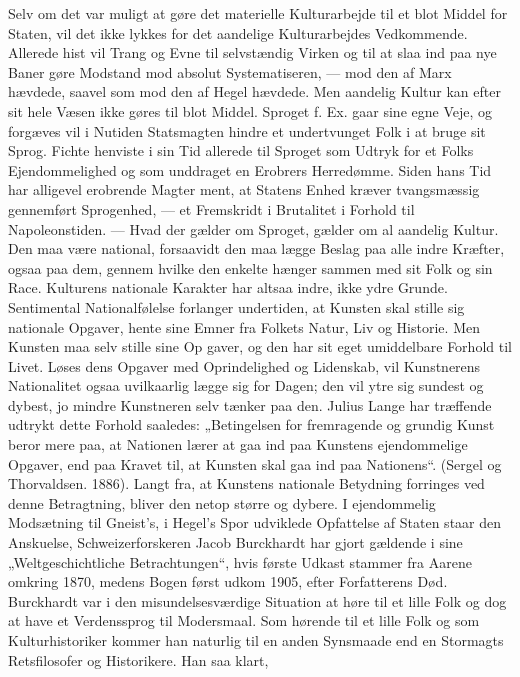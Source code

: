 \documentclass[12pt,a4paper,openany]{book}
\newcommand{\opage}[1]{\marginnote{\footnotesize\textit{[#1]}}}
\begin{document}
Selv om det var muligt at gøre det materielle Kulturarbejde til et
blot Middel for Staten, vil det ikke lykkes for det aandelige Kulturarbejdes
Vedkommende. Allerede hist vil Trang og Evne til selvstændig
Virken og til at slaa ind paa nye Baner gøre Modstand mod
absolut Systematiseren, --- mod den af Marx hævdede, saavel som
mod den af Hegel hævdede. Men aandelig Kultur kan efter sit hele
Væsen ikke gøres til blot Middel. Sproget f. Ex. gaar sine egne Veje,
og forgæves vil i Nutiden Statsmagten hindre et undertvunget Folk i
at bruge sit Sprog. Fichte henviste i sin Tid allerede til Sproget som
Udtryk for et Folks Ejendommelighed og som unddraget en Erobrers
Herredømme. Siden hans Tid har alligevel erobrende Magter ment,
at Statens Enhed kræver tvangsmæssig gennemført Sprogenhed, ---
et Fremskridt i Brutalitet i Forhold til Napoleonstiden. --- Hvad der
gælder om Sproget, gælder om al aandelig Kultur. Den maa være
national, forsaavidt den maa lægge Beslag paa alle indre Kræfter,
ogsaa paa dem, gennem hvilke den enkelte hænger sammen med sit
Folk og sin Race. Kulturens nationale Karakter har altsaa indre, ikke
ydre Grunde. Sentimental Nationalfølelse forlanger undertiden, at
Kunsten skal stille sig nationale Opgaver, hente sine Emner fra Folkets
Natur, Liv og Historie. Men Kunsten maa selv stille sine Op%
\opage{108}gaver, og den har sit eget umiddelbare Forhold til Livet. Løses dens
Opgaver med Oprindelighed og Lidenskab, vil Kunstnerens Nationalitet
ogsaa uvilkaarlig lægge sig for Dagen; den vil ytre sig sundest
og dybest, jo mindre Kunstneren selv tænker paa den. Julius Lange
har træffende udtrykt dette Forhold saaledes: „Betingelsen for fremragende
og grundig Kunst beror mere paa, at Nationen lærer at gaa
ind paa Kunstens ejendommelige Opgaver, end paa Kravet til, at
Kunsten skal gaa ind paa Nationens“. (Sergel og Thorvaldsen. 1886).
Langt fra, at Kunstens nationale Betydning forringes ved denne Betragtning,
bliver den netop større og dybere.
I ejendommelig Modsætning til Gneist’s, i Hegel’s Spor udviklede
Opfattelse af Staten staar den Anskuelse, Schweizerforskeren Jacob
Burckhardt har gjort gældende i sine „Weltgeschichtliche Betrachtungen“,
hvis første Udkast stammer fra Aarene omkring 1870, medens
Bogen først udkom 1905, efter Forfatterens Død. Burckhardt var i
den misundelsesværdige Situation at høre til et lille Folk og dog at
have et Verdenssprog til Modersmaal. Som hørende til et lille Folk
og som Kulturhistoriker kommer han naturlig til en anden Synsmaade
end en Stormagts Retsfilosofer og Historikere. Han saa klart,
\end{document}
